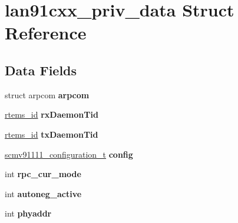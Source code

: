 \hypertarget{structlan91cxx__priv__data}{}\section{lan91cxx\+\_\+priv\+\_\+data Struct Reference}
\label{structlan91cxx__priv__data}
\subsection*{Data Fields}
\begin{DoxyCompactItemize}
\item 
\mbox{\label{structlan91cxx__priv__data_a954f00de210abe7b89d0acadab8178ce}} 
struct arpcom {\bfseries arpcom}
\item 
\mbox{\label{structlan91cxx__priv__data_a3e7413a1e0d145f198650a1c594f2f77}} 
\mbox{\hyperlink{group__ClassicTasks_gab20892b814dced7dd4e5b9bf42becd57}{rtems\+\_\+id}} {\bfseries rx\+Daemon\+Tid}
\item 
\mbox{\label{structlan91cxx__priv__data_ac64a1489b71f9aaa9b1f2931cf45140e}} 
\mbox{\hyperlink{group__ClassicTasks_gab20892b814dced7dd4e5b9bf42becd57}{rtems\+\_\+id}} {\bfseries tx\+Daemon\+Tid}
\item 
\mbox{\label{structlan91cxx__priv__data_a79e0e613f6364688c525eb7678d73679}} 
\mbox{\hyperlink{structscmv91111__configuration}{scmv91111\+\_\+configuration\+\_\+t}} {\bfseries config}
\item 
\mbox{\label{structlan91cxx__priv__data_ab477fc285bb6c6778ae766e87f514d7b}} 
int {\bfseries rpc\+\_\+cur\+\_\+mode}
\item 
\mbox{\label{structlan91cxx__priv__data_a774c553dab85f77a6c6a269a38f8c93c}} 
int {\bfseries autoneg\+\_\+active}
\item 
\mbox{\label{structlan91cxx__priv__data_a93e4138d8ae51277e87b93589e8bf988}} 
int {\bfseries phyaddr}
\item 
\mbox{\label{structlan91cxx__priv__data_aef424bc79ebc0bd7ba5639f2515b61fb}} 

\end{DoxyCompactItemize}
